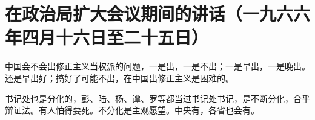 \section[在政治局扩大会议期间的讲话（一九六六年四月十六日至二十五日）]{在政治局扩大会议期间的讲话（一九六六年四月十六日至二十五日）}


中国会不会出修正主义当权派的问题，一是出，一是不出；一是早出，一是晚出。还是早出好；搞好了可能不出，在中国出修正主义是困难的。

书记处也是分化的，彭、陆、杨、谭、罗等都当过书记处书记，是不断分化，合乎辩证法。有人怕得要死。不分化是主观愿望。中央有，各省也会有。


